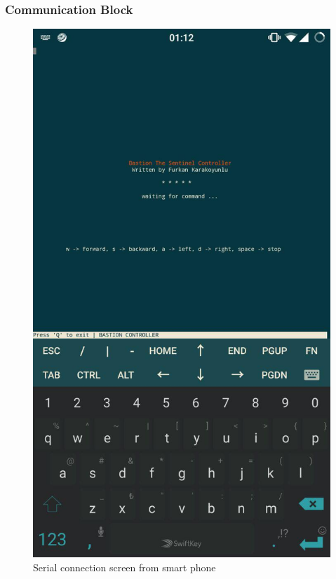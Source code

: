 \documentclass{beamer}
\begin{document}
 \begin{frame}
  \frametitle{Communication Block}
  \begin{figure}[h!]
    \begin{center}
      \includegraphics[scale=0.15]{serial_phone}
      \caption{Serial connection screen from smart phone}
    \end{center}
  \end{figure}
 \end{frame}
 
\end{document}
